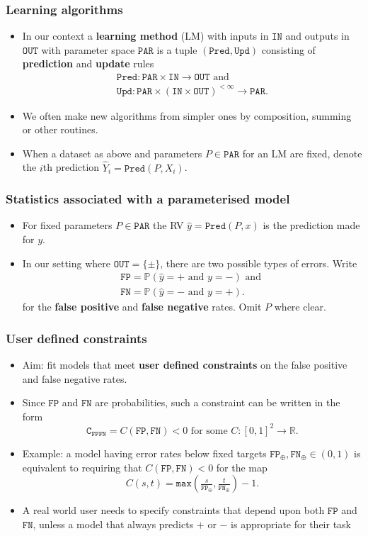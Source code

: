 \documentclass{beamer}
\newcommand{\IN}{{\texttt{IN}}}
\newcommand{\OUT}{{\texttt{OUT}}}
\newcommand{\TWO}{\{\pm\}}
\newcommand{\PAR}{{\texttt{PAR}}}
\newcommand{\UC}{{\texttt{C}_{\texttt{FPFN}}}}
\newcommand{\PRED}{{\texttt{Pred}}}
\newcommand{\yP}{{\hat y}}
\newcommand{\YP}{{\hat Y}}
\newcommand{\UPD}{{\texttt{Upd}}}
\newcommand{\FP}{{\texttt{FP}}}
\newcommand{\FN}{{\texttt{FN}}}
\newcommand{\FPT}{{\texttt{FP}_\oplus}}
\newcommand{\FNT}{{\texttt{FN}_\oplus}}
\begin{document}
\begin{frame}
\frametitle{Learning algorithms}
\begin{itemize}
\item
  In our context a \textbf{learning method} (LM) with inputs in $\IN$ and outputs in $\OUT$ with parameter space $\PAR$ is a tuple $(\PRED,\UPD)$ consisting of \textbf{prediction} and \textbf{update} rules
\begin{gather*}
  \PRED:\PAR\times\IN\rightarrow\OUT\text{ and}\\
  \UPD:\PAR\times\left(\IN\times\OUT\right)^{<\infty}\rightarrow\PAR.
\end{gather*}
\item
We often make new algorithms from simpler ones by composition, summing or other routines.
\item
  When a dataset as above and parameters $P\in\PAR$ for an LM are fixed, denote the $i$th prediction $\YP_i=\PRED(P,X_i)$.
\end{itemize}
\end{frame}
\begin{frame}
\frametitle{Statistics associated with a parameterised model}
  \begin{itemize}
\item
  For fixed parameters $P\in\PAR$ the RV $\yP=\PRED(P,x)$ is the prediction made for $y$.
\item
In our setting where $\OUT=\TWO$, there are two possible types of errors.
Write
\begin{gather*}
  \FP=\mathbb P(\yP=+\text{ and }y=-)\text{ and }\\\FN=\mathbb P(\yP=-\text{ and }y=+).
\end{gather*}
for the \textbf{false positive} and \textbf{false negative} rates.
Omit $P$ where clear.
\end{itemize}
\end{frame}
\begin{frame}
\frametitle{User defined constraints}
\begin{itemize}
\item
  Aim: fit models that meet \textbf{user defined constraints} on the false positive and false negative rates.
\item
  Since $\FP$ and $\FN$ are probabilities, such a constraint can be written in the form
$$
    \UC=C(\FP,\FN)<0\text{ for some }C:[0,1]^2\rightarrow\mathbb R.
$$
\item
  Example: a model having error rates below fixed targets $\FPT,\FNT\in(0,1)$ is equivalent to requiring that $C(\FP,\FN)<0$ for the map
  $$
    C(s,t)=\texttt{max}(\tfrac s{\FPT},\tfrac t{\FNT})-1.
  $$
\item
  A real world user needs to specify constraints that depend upon both $\FP$ and $\FN$, unless a model that always predicts $+$ or $-$ is appropriate for their task
\end{itemize}
\end{frame}
\end{document}
